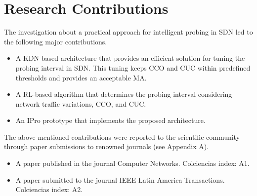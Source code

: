 \section{Research Contributions}
\label{subsub:research_contributions}
The investigation about a practical approach for intelligent probing in SDN led to the following major contributions.

\begin{itemize}
     \item A KDN-based architecture that provides an efficient solution for tuning the probing interval in SDN. This tuning keeps CCO and CUC within predefined thresholds and provides an acceptable MA.
    \item A RL-based algorithm that determines the probing interval considering network traffic variations, CCO, and CUC.
    \item An IPro prototype that implements the proposed architecture.
\end{itemize}

The above-mentioned contributions were reported to the scientific community through paper submissions to renowned journals (see Appendix A).

\begin{itemize}
    \item A paper published in the journal Computer Networks. Colciencias index: A1. %
    \item A paper submitted to the journal IEEE Latin America Transactions. Colciencias index: A2. %
\end{itemize}{}